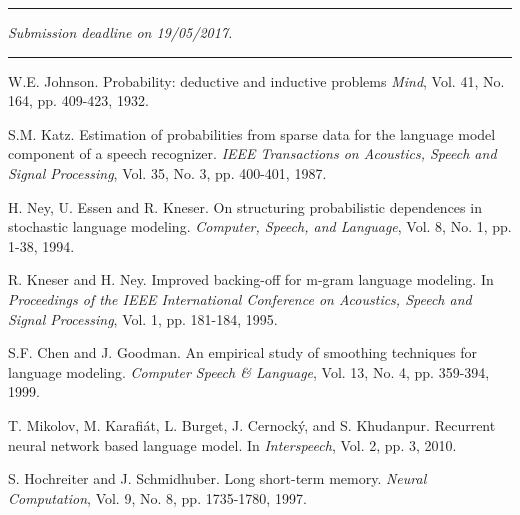 \documentclass[a4paper, 12pt]{article}
\newcommand{\horrule}[1]{\rule{\linewidth}{#1}}
\newcommand{\tit}[1]{\textit{#1}}
\begin{document}
\begin{center}
\horrule{1pt}
\tit{Submission deadline on 19/05/2017.} \\[-5pt]
\horrule{1pt}
\end{center}

\begin{thebibliography}{99}

	W.E. Johnson. Probability: deductive and inductive problems
	\tit{Mind}, Vol. 41, No. 164, pp. 409-423, 1932.
	
	S.M. Katz. Estimation of probabilities from sparse data for the language model component of a speech recognizer. \tit{IEEE Transactions on Acoustics, Speech and Signal Processing}, Vol. 35, No. 3, pp. 400-401, 1987.
	
	H. Ney, U. Essen and R. Kneser. On structuring probabilistic dependences in stochastic language modeling. \tit{Computer, Speech, and Language}, Vol. 8, No. 1, pp. 1-38, 1994.   
	
	R. Kneser and H. Ney. Improved backing-off for m-gram language modeling. In \tit{Proceedings of the IEEE International Conference on Acoustics, Speech and Signal Processing}, Vol. 1, pp. 181-184, 1995.

	S.F. Chen and J. Goodman. An empirical study of smoothing techniques for language modeling. \tit{Computer Speech \& Language}, Vol. 13, No. 4, pp. 359-394, 1999.

	T. Mikolov, M. Karafi\'{a}t, L. Burget, J. Cernock\'{y}, and S. Khudanpur. Recurrent neural network based language model. In \tit{Interspeech}, Vol. 2, pp. 3, 2010.
	
	S. Hochreiter and J. Schmidhuber. Long short-term memory. \tit{Neural Computation}, Vol. 9, No. 8, pp. 1735-1780, 1997.

\end{thebibliography}
\end{document}
